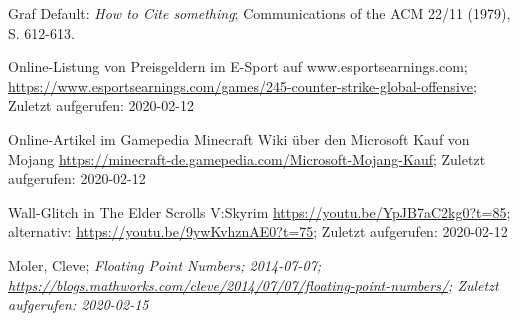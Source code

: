         Graf Default: {\sl How to Cite something}; 
        Communications of the ACM 22/11 (1979), S. 612-613.

		Online-Listung von Preisgeldern im E-Sport auf www.esportsearnings.com;
		\url{https://www.esportsearnings.com/games/245-counter-strike-global-offensive}; Zuletzt aufgerufen: 2020-02-12

		Online-Artikel im Gamepedia Minecraft Wiki über den Microsoft Kauf von Mojang
		\url{https://minecraft-de.gamepedia.com/Microsoft-Mojang-Kauf}; Zuletzt aufgerufen: 2020-02-12

		Wall-Glitch in The Elder Scrolls V:Skyrim
		\url{https://youtu.be/YpJB7aC2kg0?t=85}; 
		alternativ: \url{https://youtu.be/9ywKvhznAE0?t=75};
		Zuletzt aufgerufen: 2020-02-12

		Moler, Cleve; \sl{Floating Point Numbers}; 2014-07-07;
		\url{https://blogs.mathworks.com/cleve/2014/07/07/floating-point-numbers/};
		Zuletzt aufgerufen: 2020-02-15
